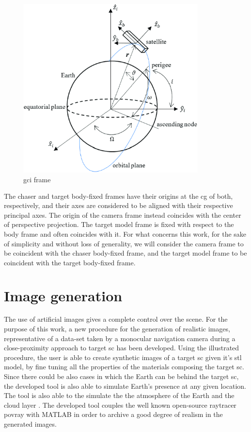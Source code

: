\begin{figure}[htbp]
  \centering
  \includegraphics[width=0.85\textwidth]{gfx/gci.eps}
  \caption{\acrfull{gci} frame}
  \label{fig:raytracing}
\end{figure}

The chaser and target body-fixed frames have their origins at the \acrshort{cg} of both, respectively, and their axes are considered to be aligned with their respective principal axes. The origin of the camera frame instead coincides with the center of perspective projection. The target model frame is fixed with respect to the body frame and often coincides with it. For what concerns this work, for the sake of simplicity and without loss of generality, we will consider the camera frame to be coincident with the chaser body-fixed frame, and the target model frame to be coincident with the target body-fixed frame. 

\section{Image generation}
The use of artificial images gives a complete control over the scene. For the purpose of this work, a new procedure for the generation of realistic images, representative of a data-set taken by a monocular navigation camera during a close-proximity approach to target \acrshort{sc} has been developed.
Using the illustrated procedure, the user is able to create synthetic images of a target \acrshort{sc} given it's \acrshort{stl} model, by fine tuning all the properties of the materials composing the target \acrshort{sc}.
Since there could be also cases in which the Earth can be behind the target \acrshort{sc}, the developed tool is also able to simulate Earth's presence at any given location. The tool is also able to the simulate the the atmosphere of the Earth and the cloud layer \cite{jacopo}.
The developed tool couples the well known open-source raytracer \acrshort{povray} with MATLAB in order to archive a good degree of realism in the generated images.

